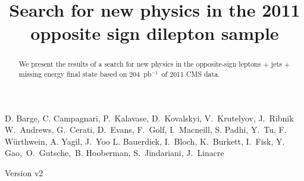 \documentclass{cmspaper}
\newcommand{\lumi}{204~pb$^{-1}$}
\begin{document}
  

\begin{titlepage}
    \pagestyle {plain}

  \title {Search for new physics in the 2011 opposite sign dilepton sample}
\begin{Authlist}
D. Barge, C. Campagnari, P.~Kalavase, D.~Kovalskyi, V.~Krutelyov, J.~Ribnik
W.~Andrews, G.~Cerati, D.~Evans, F.~Golf, I.~Macneill, S. Padhi, Y.~Tu, F. W\"urthwein, A. Yagil, J.~Yoo
L. Bauerdick, I.~Bloch, K.~Burkett, I.~Fisk, Y.~ Gao,~O.~Gutsche,~B. Hooberman, S.~Jindariani, J.~Linacre
\end{Authlist}
 
Version v2

\begin{abstract}
  We present the results of a search for new physics in the opposite-sign 
  leptons $+$ jets $+$ missing energy final state based on \lumi\
  of 2011 CMS data.
\end{abstract}

\end{titlepage}
\newpage


\tableofcontents
\newpage
\linenumbers
%









%

%
%

\clearpage

\clearpage
\appendixtitleon
\appendixtitletocon
\begin{appendices}
   
   
   
   
\end{appendices}
\end{document}
